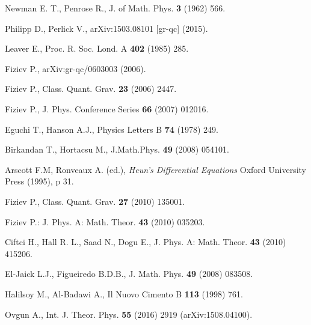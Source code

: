 \documentclass{article}
\begin{document}
\begin{thebibliography}{99}
 Newman E. T., Penrose R., J. of Math. Phys.  {\bf 3} (1962) 566.

 Philipp D., Perlick V., arXiv:1503.08101 [gr-qc] (2015).

 Leaver E., Proc. R. Soc. Lond. A {\bf 402} (1985) 285.

 Fiziev P., arXiv:gr-qc/0603003 (2006).

 Fiziev P.,  Class. Quant. Grav. \textbf{23} (2006) 2447.

 Fiziev P., J. Phys. Conference Series \textbf{66} (2007) 012016.

 Eguchi T., Hanson A.J., Physics Letters B {\bf 74} (1978) 249.

 Birkandan T., Hortacsu M., J.Math.Phys. {\bf 49} (2008) 054101.

 Arscott F.M, Ronveaux A. (ed.), {\textit{Heun's Differential Equations}} Oxford University Press (1995), p 31.

 Fiziev P., Class. Quant. Grav. {\bf 27} (2010) 135001.

 Fiziev P.: J. Phys. A: Math. Theor. {\bf43} (2010) 035203.

 Ciftci H., Hall R. L., Saad N., Dogu E., J. Phys. A: Math. Theor. {\bf 43} (2010) 415206.

 El-Jaick L.J., Figueiredo B.D.B., J. Math. Phys. {\bf 49} (2008) 083508.

 Halilsoy M., Al-Badawi A., Il Nuovo Cimento B {\bf 113} (1998) 761.

 Ovgun A., Int. J. Theor. Phys. {\bf 55} (2016) 2919 (arXiv:1508.04100).
\end{thebibliography}
\end{document}
